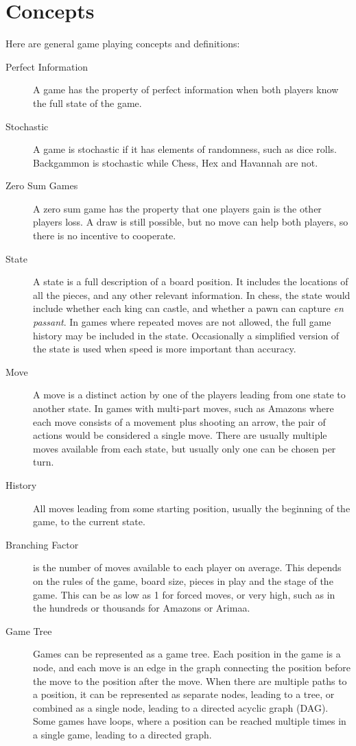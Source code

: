 
\section{Concepts}
Here are general game playing concepts and definitions:

\begin{description}
\item[Perfect Information] A game has the property of perfect information when both players know the full state of the game.
\item[Stochastic] A game is stochastic if it has elements of randomness, such as dice rolls. Backgammon is stochastic while Chess, Hex and Havannah are not.
\item[Zero Sum Games] A zero sum game has the property that one players gain is the other players loss. A draw is still possible, but no move can help both players, so there is no incentive to cooperate.
\item[State] A state is a full description of a board position. It includes the locations of all the pieces, and any other relevant information. In chess, the state would include whether each king can castle, and whether a pawn can capture \textit{en passant}. In games where repeated moves are not allowed, the full game history may be included in the state. Occasionally a simplified version of the state is used when speed is more important than accuracy.
\item[Move] A move is a distinct action by one of the players leading from one state to another state. In games with multi-part moves, such as Amazons where each move consists of a movement plus shooting an arrow, the pair of actions would be considered a single move. There are usually multiple moves available from each state, but usually only one can be chosen per turn.
\item[History] All moves leading from some starting position, usually the beginning of the game, to the current state.
\item[Branching Factor] is the number of moves available to each player on average. This depends on the rules of the game, board size, pieces in play and the stage of the game. This can be as low as 1 for forced moves, or very high, such as in the hundreds or thousands for Amazons or Arimaa.
\item[Game Tree] Games can be represented as a game tree. Each position in the game is a node, and each move is an edge in the graph connecting the position before the move to the position after the move. When there are multiple paths to a position, it can be represented as separate nodes, leading to a tree, or combined as a single node, leading to a directed acyclic graph (DAG). Some games have loops, where a position can be reached multiple times in a single game, leading to a directed graph.

\end{description}

